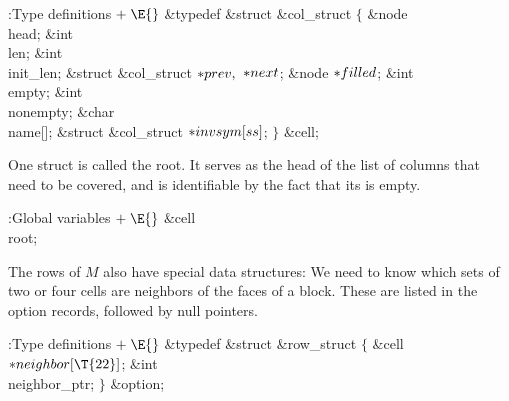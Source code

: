 \Y\B\4:Type definitions\X${}\mathrel+\E{}$\6
\&{typedef} \&{struct} \&{col\_struct} ${}\{{}$\1\6
\&{node} \\{head};\6
\&{int} \\{len};\6
\&{int} \\{init\_len};%
\6
\&{struct} \&{col\_struct} ${}{*}\\{prev},{}$ ${}{*}\\{next}{}$;\6
\&{node} ${}{*}\\{filled}{}$;\6
\&{int} \\{empty};\6
\&{int} \\{nonempty};\6
\&{char} \\{name}[];\6
\&{struct} \&{col\_struct} ${}{*}\\{invsym}[\\{ss}]{}$;\2\6
${}\}{}$ \&{cell};\par
\fi

One  struct is called the root. It serves
as the head of the
list of columns that need to be covered, and is identifiable by the fact
that its  is empty.

\Y\B\4:Global variables\X${}\mathrel+\E{}$\6
\&{cell} \\{root};\par
\fi

The rows of $M$ also have special data structures:
We need to know which sets of two or four cells are neighbors of the
faces of a block. These are listed in the option records,
followed by null pointers.

\Y\B\4:Type definitions\X${}\mathrel+\E{}$\6
\&{typedef} \&{struct} \&{row\_struct} ${}\{{}$\1\6
\&{cell} ${}{*}\\{neighbor}[\T{22}]{}$;\6
\&{int} \\{neighbor\_ptr};\2\6
${}\}{}$ \&{option};\par
\fi

